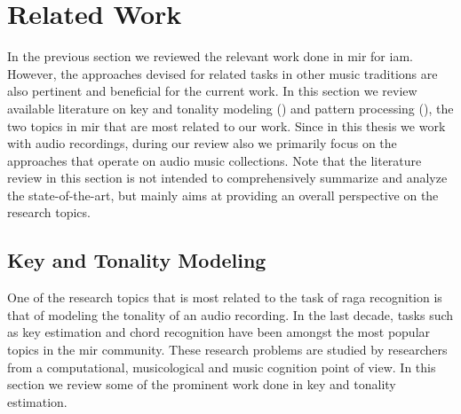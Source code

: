 \section{Related Work}
\label{sec:background_relevant_work_other_music}


In the previous section we reviewed the relevant work done in \gls{mir} for \gls{iam}. However, the approaches devised for related tasks in other music traditions are also pertinent and beneficial for the current work. In this section we review available literature on key and tonality modeling () and pattern processing (), the two topics in \gls{mir} that are most related to our work. Since in this thesis we work with audio recordings, during our review also we primarily focus on the approaches that operate on audio music collections. Note that the literature review in this section is not intended to comprehensively summarize and analyze the state-of-the-art, but mainly aims at providing an overall perspective on the research topics.

\subsection{Key and Tonality Modeling}
\label{sec:background_key_and_tonality_modeling}


One of the research topics that is most related to the task of \gls{raga} recognition is that of modeling the tonality of an audio recording. In the last decade, tasks such as key estimation and chord recognition have been amongst the most popular topics in the \gls{mir} community. These research problems are studied by researchers from a computational, musicological and music cognition point of view. In this section we review some of the prominent work done in key and tonality estimation. 

